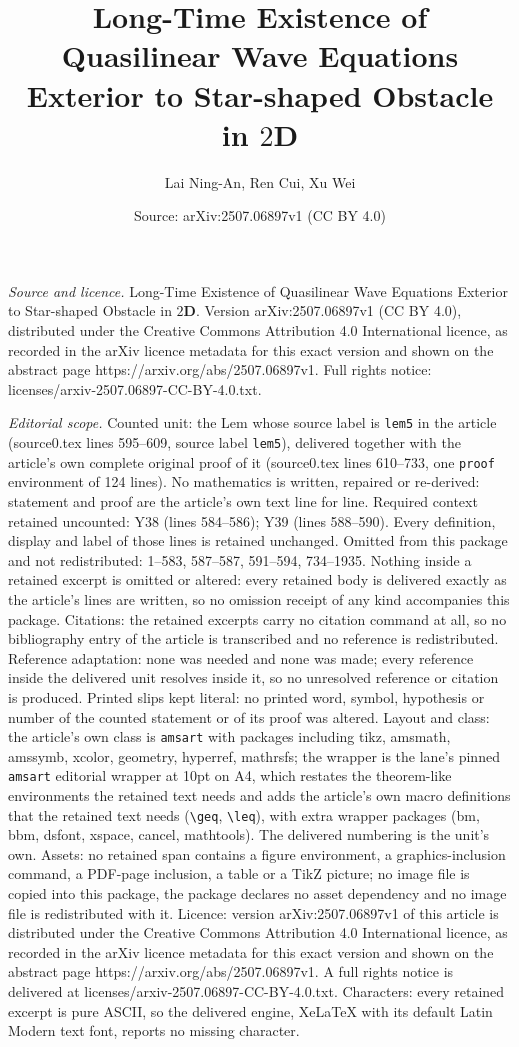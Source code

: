 \documentclass[10pt,a4paper]{amsart}
\title[Long-Time Existence of Quasilinear Wave Equations Exterior t]{Long-Time Existence of Quasilinear Wave Equations Exterior to Star-shaped Obstacle in $2\mathbf{D}$}
\author{Lai Ning-An, Ren Cui, Xu Wei}
\date{Source: arXiv:2507.06897v1 (CC BY 4.0)}
\begin{document}
\maketitle

\noindent\emph{Source and licence.} Long-Time Existence of Quasilinear Wave Equations Exterior to Star-shaped Obstacle in $2\mathbf{D}$. Version arXiv:2507.06897v1 (CC BY 4.0), distributed under the Creative Commons Attribution 4.0 International licence, as recorded in the arXiv licence metadata for this exact version and shown on the abstract page https://arxiv.org/abs/2507.06897v1. Full rights notice: licenses/arxiv-2507.06897-CC-BY-4.0.txt.\par\smallskip

\noindent\textit{Editorial scope.} Counted unit: the Lem whose source label is \texttt{lem5} in the article (source0.tex lines 595--609, source label \texttt{lem5}), delivered together with the article's own complete original proof of it (source0.tex lines 610--733, one \texttt{proof} environment of 124 lines). No mathematics is written, repaired or re-derived: statement and proof are the article's own text line for line. Required context retained uncounted: Y38 (lines 584--586); Y39 (lines 588--590). Every definition, display and label of those lines is retained unchanged. Omitted from this package and not redistributed: 1--583, 587--587, 591--594, 734--1935. Nothing inside a retained excerpt is omitted or altered: every retained body is delivered exactly as the article's lines are written, so no omission receipt of any kind accompanies this package. Citations: the retained excerpts carry no citation command at all, so no bibliography entry of the article is transcribed and no reference is redistributed. Reference adaptation: none was needed and none was made; every reference inside the delivered unit resolves inside it, so no unresolved reference or citation is produced. Printed slips kept literal: no printed word, symbol, hypothesis or number of the counted statement or of its proof was altered. Layout and class: the article's own class is \texttt{amsart} with packages including tikz, amsmath, amssymb, xcolor, geometry, hyperref, mathrsfs; the wrapper is the lane's pinned \texttt{amsart} editorial wrapper at 10pt on A4, which restates the theorem-like environments the retained text needs and adds the article's own macro definitions that the retained text needs (\texttt{\textbackslash geq}, \texttt{\textbackslash leq}), with extra wrapper packages (bm, bbm, dsfont, xspace, cancel, mathtools). The delivered numbering is the unit's own. Assets: no retained span contains a figure environment, a graphics-inclusion command, a PDF-page inclusion, a table or a TikZ picture; no image file is copied into this package, the package declares no asset dependency and no image file is redistributed with it. Licence: version arXiv:2507.06897v1 of this article is distributed under the Creative Commons Attribution 4.0 International licence, as recorded in the arXiv licence metadata for this exact version and shown on the abstract page https://arxiv.org/abs/2507.06897v1. A full rights notice is delivered at licenses/arxiv-2507.06897-CC-BY-4.0.txt. Characters: every retained excerpt is pure ASCII, so the delivered engine, XeLaTeX with its default Latin Modern text font, reports no missing character.
\end{document}

